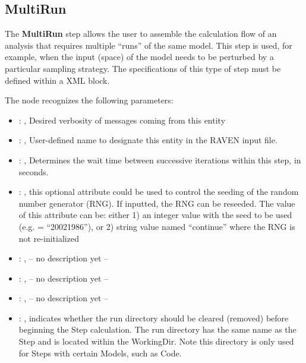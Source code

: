 

\subsection{MultiRun}
   The \textbf{MultiRun} step allows the user to assemble the calculation flow of an analysis that
  requires multiple ``runs'' of the same model. This step is used, for example, when the input
  (space) of the model needs to be perturbed by a particular sampling strategy. The specifications
  of this type of step must be defined within a  XML block.

  The  node recognizes the following parameters:
    \begin{itemize}
      \item {}: ,
        Desired verbosity of messages coming from this entity
      \item {}: ,
        User-defined name to designate this entity in the RAVEN input file.
      \item {}: ,
        Determines the wait time between successive iterations within this step, in seconds.
      \item {}: ,
         this optional attribute could be used to control the seeding of the random number generator
        (RNG). If inputted, the RNG can be reseeded. The value of this attribute can be: either 1)
        an integer value with the seed to be used (e.g.  = ``20021986''), or 2)
        string value named ``continue'' where the RNG is not re-initialized
      \item {}: ,
        -- no description yet --
      \item {}: ,
        -- no description yet --
      \item {}: ,
        -- no description yet --
      \item {}: ,
        indicates whether the run directory should be cleared (removed) before beginning
        the Step calculation. The run directory has the same name as the Step and is located
        within the WorkingDir. Note this directory is only used for Steps with certain Models,
        such as Code.               
  \end{itemize}

